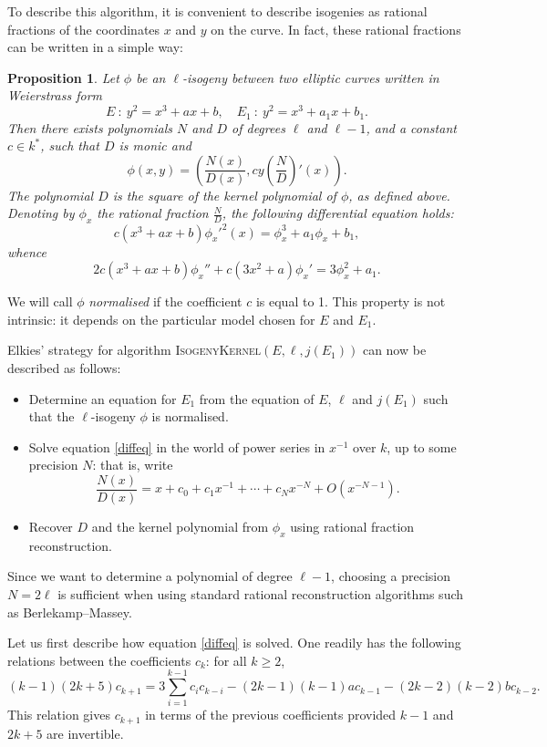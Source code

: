 \documentclass{article}
\newcommand{\algstyle}[1]{\textsc{#1}}
\newtheorem{prop}[theorem]{Proposition}
\theoremstyle{definition}
\begin{document}
To describe this algorithm, it is convenient to describe isogenies as
rational fractions of the coordinates $x$ and $y$ on the curve. In fact, these
rational fractions can be written in a simple way:

\begin{prop}
Let $\phi$ be an $\ell$-isogeny between two elliptic curves written in
Weierstrass form
\[
E\ :\ y^2 = x^3 + ax + b, \quad E_1\ :\ y^2 = x^3 + a_1x + b_1.
\]
Then there exists polynomials $N$ and $D$ of degrees $\ell$ and $\ell-1$,
and a constant $c\in k^*$, such that $D$ is monic and
\[
\phi(x, y) = \left(\frac{N(x)}{D(x)}, cy\left(\frac{N}{D}\right)'(x)\right).
\]
The polynomial $D$ is the square of the kernel polynomial of $\phi$, as defined
above. Denoting by $\phi_x$ the rational fraction $\frac{N}{D}$,
the following differential equation holds:
\[
c(x^3 + ax + b)\phi_x'^2(x) = \phi_x^3 + a_1\phi_x + b_1,
\]
whence
\begin{equation}
\label{diffeq}
2c(x^3 + ax + b)\phi_x'' + c(3x^2 + a)\phi_x' =
 3\phi_x^2 + a_1.
\end{equation}
\end{prop}

We will call $\phi$ \emph{normalised} if the coefficient $c$ is equal to 1.
This property is not intrinsic: it depends on the particular model chosen
for $E$ and $E_1$.

Elkies' strategy for algorithm \algstyle{IsogenyKernel}$(E, \ell, j(E_1))$ can now be described
as follows:
\begin{itemize}
\item Determine an equation for $E_1$ from the equation of $E$, $\ell$ and
 $j(E_1)$ such that the $\ell$-isogeny $\phi$ is normalised.
\item Solve equation \ref{diffeq} in the world of power series in $x^{-1}$ over $k$, up to
 some precision $N$: that is, write
\[
\frac{N(x)}{D(x)} = x + c_0 + c_1 x^{-1} + \cdots + c_N x^{-N} + O(x^{-N-1}).
\]
\item Recover $D$ and the kernel polynomial from $\phi_x$ using rational
 fraction reconstruction.
\end{itemize}

Since we want to determine a polynomial of degree $\ell-1$, choosing a precision $N = 2\ell$
is sufficient when using standard rational reconstruction algorithms such as Berlekamp--Massey.

Let us first describe how equation \ref{diffeq} is solved. One readily
has the following relations between the coefficients $c_k$: for all $k\geq 2$,
\begin{equation}
\label{eq:rec}
 (k-1)(2k+5)c_{k+1} = 3\sum_{i=1}^{k-1}c_i c_{k-i}
	- (2k-1)(k-1)a c_{k-1} - (2k-2)(k-2)b c_{k-2}.
\end{equation}
This relation gives $c_{k+1}$ in terms of the previous coefficients provided $k-1$
and $2k+5$ are invertible.
\end{document}

